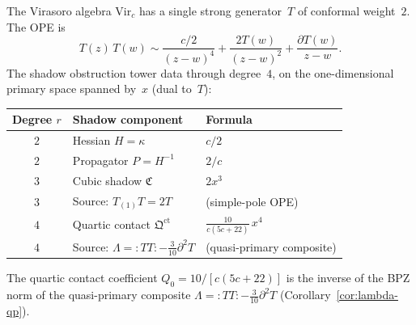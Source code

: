 \begin{computation}
\label{comp:virasoro-tower-data}
The Virasoro algebra $\mathrm{Vir}_c$ has a single strong
generator~$T$ of conformal weight~$2$. The OPE is
\begin{equation}\label{eq:virasoro-ope-full}
T(z)\,T(w) \sim
\frac{c/2}{(z-w)^4}
+ \frac{2T(w)}{(z-w)^2}
+ \frac{\partial T(w)}{z-w}.
\end{equation}
The shadow obstruction tower data through degree~$4$, on the
one-dimensional primary space spanned by~$x$
(dual to~$T$):

\begin{center}
\renewcommand{\arraystretch}{1.5}
\begin{tabular}{cll}
\toprule
Degree $r$ & Shadow component & Formula \\
\midrule
$2$ & Hessian $H = \kappa$ & $c/2$ \\
$2$ & Propagator $P = H^{-1}$ & $2/c$ \\
$3$ & Cubic shadow $\mathfrak{C}$ & $2x^3$ \\
$3$ & Source: $T_{(1)}T = 2T$ & (simple-pole OPE) \\
$4$ & Quartic contact $\mathfrak{Q}^{\mathrm{ct}}$ &
 $\displaystyle\frac{10}{c(5c+22)}\,x^4$ \\
$4$ & Source: $\Lambda = {:}TT{:}
 - \tfrac{3}{10}\partial^2 T$ & (quasi-primary composite)\\
\bottomrule
\end{tabular}
\end{center}

\noindent The quartic contact coefficient
$Q_0 = 10/[c(5c+22)]$ is the inverse of the BPZ norm of
the quasi-primary composite
$\Lambda = {:}TT{:} - \frac{3}{10}\partial^2 T$
(Corollary~\ref{cor:lambda-qp}).
\end{computation}

